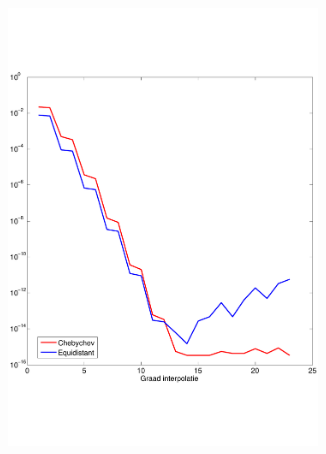 \documentclass[a4paper, 12pt, titlepage]{report}
\begin{document}
 \begin{figure}
 \begin{subfigure}{0.5\textwidth}
 \centering
 \includegraphics[width=0.9\textwidth]{maxCos.pdf}
 \end{subfigure}
 \begin{subfigure}{0.5\textwidth}
 \centering

\end{subfigure}
\end{figure}
\end{document}
